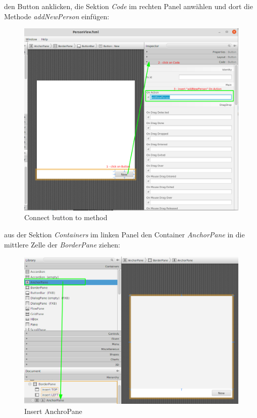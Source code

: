 \documentclass[11pt]{scrartcl}
\begin{document}
\newpage
den Button anklicken, die Sektion \textit{Code} im rechten Panel anwählen
und dort die Methode \textit{addNewPerson} einfügen:
\begin{figure}[!ht]
    \includegraphics[width=\linewidth]{images/eclipse29_connect_method.png}
    \caption{Connect button to method}
    \label{fig:connectbuttontomethod}
\end{figure}

\newpage
aus der Sektion \textit{Containers} im linken Panel den Container \textit{AnchorPane}
in die mittlere Zelle der \textit{BorderPane} ziehen:
\begin{figure}[!ht]
    \includegraphics[width=\linewidth]{images/eclipse30_insert_anchorpane.png}
    \caption{Insert AnchroPane}
    \label{fig:insertanchorpane}
\end{figure}
\end{document}
